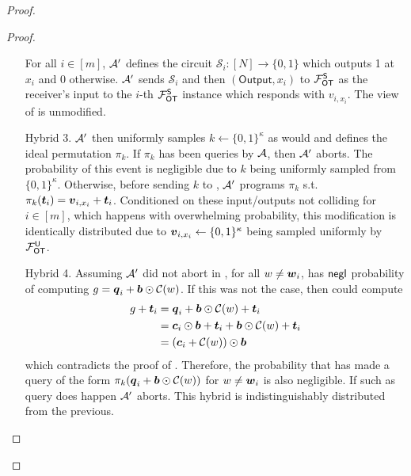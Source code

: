 \begin{proof}
\begin{proof}
\begin{enumerate}[leftmargin=1.8cm]
			For all $i\in[m]$, $\mathcal{A}'$ defines the circuit $\mathcal{S}_i:[N]\rightarrow\{0,1\}$ which outputs 1 at $x_i$ and 0 otherwise. $\mathcal{A}'$ sends $\mathcal{S}_i$ and then $(\textsf{Output}, x_i)$ to $\mathcal{F}_{\mathsf{OT}}^\mathsf{S}$ as the receiver's input to the $i$-th  $\mathcal{F}_{\mathsf{OT}}^\mathsf{S}$ instance which responds with $v_{i,x_i}$. The view of \Adv is unmodified.
			
			
			\item[Hybrid 3.] $\mathcal{A}'$ then uniformly samples $k\gets\{0,1\}^\kappa$ as \send would and defines the ideal permutation $\pi_k$. If $\pi_k$ has been queries by $\mathcal{A}$, then $\mathcal{A}'$ aborts. The probability of this event is negligible due to $k$ being uniformly sampled from $\{0,1\}^\kappa$. Otherwise, before sending $k$ to \send, $\mathcal{A}'$ programs $\pi_k$ s.t.  $\pi_k(\boldsymbol{t}_i)=\boldsymbol{v}_{i, x_i}+\boldsymbol{t}_i$. Conditioned on these input/outputs not colliding for $i\in[m]$, which happens with overwhelming probability, this modification is identically distributed due to $\boldsymbol{v}_{i, x_i}\gets\{0,1\}^\kappa$ being sampled uniformly by $\mathcal{F}_{\mathsf{OT}}^\mathsf{U}$.
			
			
			\item[Hybrid 4.]\label{hybrid:simOutputR} Assuming $\mathcal{A}'$ did not abort in , for all $w\neq \boldsymbol{w}_i$, \Adv has $\mathsf{negl}$ probability of computing $g=\boldsymbol{q}_i+\boldsymbol{b}\odot \mathcal{C}(w)$. If this was not the case, then \Adv  could compute
			\begin{align*}
			g +\boldsymbol{t}_i &=\boldsymbol{q}_i+\boldsymbol{b}\odot \mathcal{C}(w)+\boldsymbol{t}_i\\
			&=\boldsymbol{c}_i\odot\boldsymbol{b}+\boldsymbol{t}_i+\boldsymbol{b}\odot \mathcal{C}(w)+\boldsymbol{t}_i\\
			&=(\boldsymbol{c}_i+\mathcal{C}(w))\odot \boldsymbol{b}
			\end{align*}
			which contradicts the proof of .
			Therefore, the probability that \Adv has made a query of the form $\pi_k(\boldsymbol{q}_i+\boldsymbol{b}\odot \mathcal{C}(w))$ for $w\neq \boldsymbol{w}_i$ is also negligible. If such as query does happen $\mathcal{A}'$ aborts. This hybrid is indistinguishably distributed from the previous. 
			

\end{enumerate}
\end{proof}
\end{proof}
